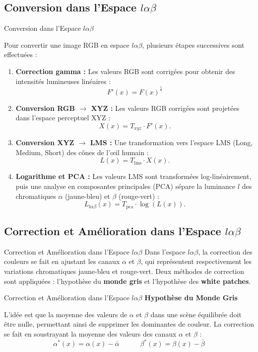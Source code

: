 \documentclass[8pt,a4paper]{beamer}
\numberwithin{figure}{section}
\begin{document}
\subsection{Conversion dans l'Espace $l\alpha\beta$}
\begin{frame}{Conversion dans l'Espace $l\alpha\beta$}
\par Pour convertir une image RGB en espace \( l\alpha\beta \), plusieurs étapes successives sont effectuées :
\vspace{3mm}
\begin{enumerate}
    \item \textbf{Correction gamma :} Les valeurs RGB sont corrigées pour obtenir des intensités lumineuses linéaires :
    \[
    F'(x) = F(x)^{\frac{1}{\gamma}}
    \]
    \item \textbf{Conversion RGB \(\to\) XYZ :} Les valeurs RGB corrigées sont projetées dans l'espace perceptuel XYZ :
    \[
    X(x) = T_{xyz} \cdot F'(x).
    \]
    \item \textbf{Conversion XYZ \(\to\) LMS :} Une transformation vers l'espace LMS (Long, Medium, Short) des cônes de l'œil humain :
    \[
    L(x) = T_{\text{lms}} \cdot X(x).
    \]
    \item \textbf{Logarithme et PCA :} Les valeurs LMS sont transformées log-linéairement, puis une analyse en composantes principales (PCA) sépare la luminance \( l \) des chromatiques \( \alpha \) (jaune-bleu) et \( \beta \) (rouge-vert) :
    \[
    L_{l\alpha\beta}(x) = T_{\text{pca}} \cdot \log\left(L(x)\right).
    \]
\end{enumerate}
\end{frame}

\subsection{Correction et Amélioration dans l'Espace \( l\alpha\beta \)}
\begin{frame}{Correction et Amélioration dans l'Espace \( l\alpha\beta \)}
Dans l'espace \( l\alpha\beta \), la correction des couleurs se fait en ajustant les canaux \( \alpha \) et \( \beta \), qui représentent respectivement les variations chromatiques jaune-bleu et rouge-vert. Deux méthodes de correction sont appliquées : l'hypothèse du \textbf{monde gris} et l'hypothèse des \textbf{white patches}.

\end{frame}

\begin{frame}{Correction et Amélioration dans l'Espace \( l\alpha\beta \)}
\textbf{Hypothèse du Monde Gris}
\vspace{3mm}
\par L'idée est que la moyenne des valeurs de \( \alpha \) et \( \beta \) dans une scène équilibrée doit être nulle, permettant ainsi de supprimer les dominantes de couleur. La correction se fait en soustrayant la moyenne des valeurs des canaux \( \alpha \) et \( \beta \) :
   \[
   \alpha^*(x) = \alpha(x) - \bar{\alpha} \quad\quad\quad \beta^*(x) = \beta(x) - \bar{\beta}
   \]
\end{frame}
\end{document}
